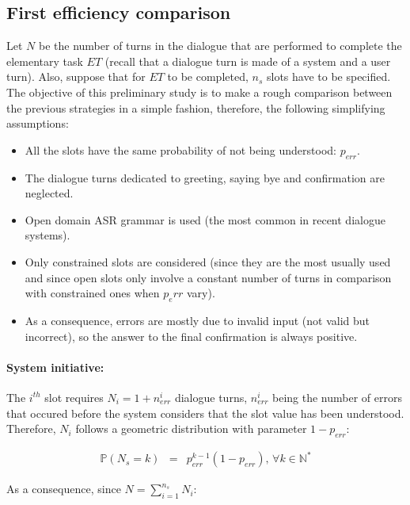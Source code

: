 	\subsection{First efficiency comparison}
	
		Let $N$ be the number of turns in the dialogue that are performed to complete the elementary task $ET$ (recall that a dialogue turn is made of a system and a user turn). Also, suppose that for $ET$ to be completed, $n_s$ slots have to be specified. The objective of this preliminary study is to make a rough comparison between the previous strategies in a simple fashion, therefore, the following simplifying assumptions:
		
		\begin{itemize}
			\item All the slots have the same probability of not being understood: $p_{err}$.
			\item The dialogue turns dedicated to greeting, saying bye and confirmation are neglected.
			\item Open domain ASR grammar is used (the most common in recent dialogue systems).
			\item Only constrained slots are considered (since they are the most usually used and since open slots only involve a constant number of turns in comparison with constrained ones when $p_err$ vary).
			\item As a consequence, errors are mostly due to invalid input (not valid but incorrect), so the answer to the final confirmation is always positive.
		\end{itemize}

                \paragraph{System initiative:} The $i^{th}$ slot requires $N_i = 1 + n^i_{err}$ dialogue turns, $n^i_{err}$ being the number of errors that occured before the system considers that the slot value has been understood. Therefore, $N_i$ follows a geometric distribution with parameter $1-p_{err}$:

                     \begin{eqnarray}
                       \mathbb{P} (N_s = k) & = & p_{err}^{k-1} (1-p_{err}) \text{,  } \forall k \in \mathbb{N}^*
                     \end{eqnarray}

                     As a consequence, since $N = \sum_{i=1}^{n_s} N_i$:

